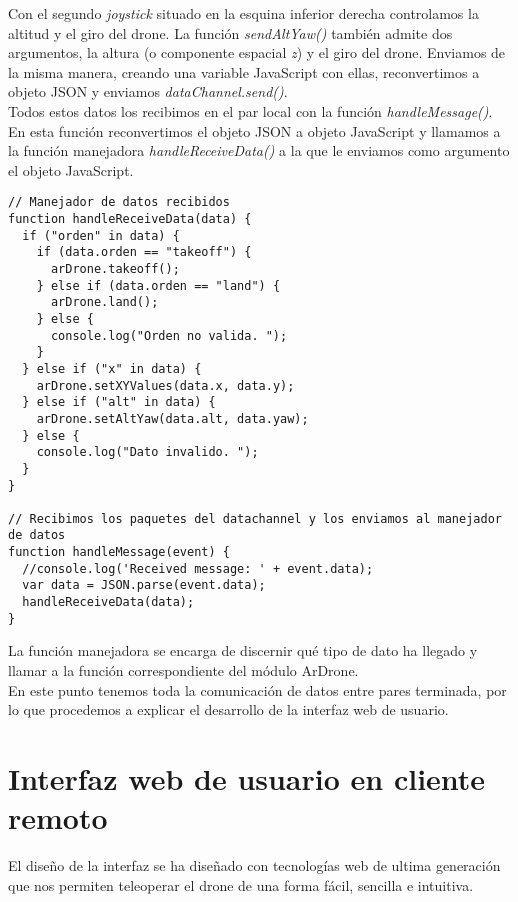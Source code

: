 Con el segundo \emph{joystick} situado en la esquina inferior derecha controlamos la altitud y el giro del drone. La función \emph{sendAltYaw()} también admite dos argumentos, la altura (o componente espacial \emph{z}) y el giro del drone. Enviamos de la misma manera, creando una variable JavaScript con ellas, reconvertimos a objeto JSON y enviamos \emph{dataChannel.send()}.\\

Todos estos datos los recibimos en el par local con la función \emph{handleMessage()}. En esta función reconvertimos el objeto JSON a objeto JavaScript y llamamos a la función manejadora \emph{handleReceiveData()} a la que le enviamos como argumento el objeto JavaScript.\\

\begin{lstlisting}[caption=Manejo de las órdenes recibidas en el par local.]
// Manejador de datos recibidos 
function handleReceiveData(data) {
  if ("orden" in data) {
    if (data.orden == "takeoff") {
      arDrone.takeoff();
    } else if (data.orden == "land") {
      arDrone.land();
    } else {
      console.log("Orden no valida. ");
    }
  } else if ("x" in data) {
    arDrone.setXYValues(data.x, data.y);
  } else if ("alt" in data) {
    arDrone.setAltYaw(data.alt, data.yaw);
  } else {
    console.log("Dato invalido. ");
  }		
}

// Recibimos los paquetes del datachannel y los enviamos al manejador de datos
function handleMessage(event) {
  //console.log('Received message: ' + event.data);
  var data = JSON.parse(event.data);
  handleReceiveData(data);
}
\end{lstlisting}


La función manejadora se encarga de discernir qué tipo de dato ha llegado y llamar a la función correspondiente del módulo ArDrone.\\

En este punto tenemos toda la comunicación de datos entre pares terminada, por lo que procedemos a explicar el desarrollo de la interfaz web de usuario.\\

\section{Interfaz web de usuario en cliente remoto}

El diseño de la interfaz se ha diseñado con tecnologías web de ultima generación que nos permiten teleoperar el drone de una forma fácil, sencilla e intuitiva.\\

